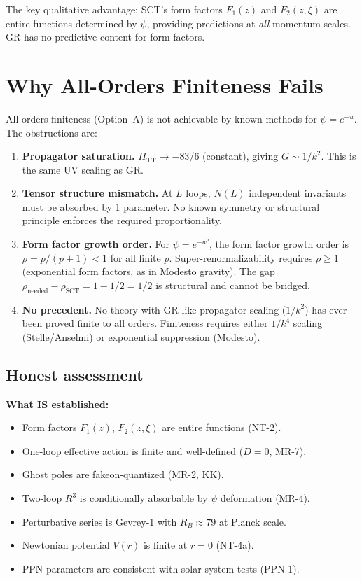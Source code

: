 \documentclass[12pt,a4paper]{article}
\begin{document}
The key qualitative advantage: SCT's form factors $F_1(z)$ and $F_2(z,\xi)$
are entire functions determined by $\psi$, providing predictions at
\emph{all} momentum scales. GR has no predictive content for form factors.

\section{Why All-Orders Finiteness Fails}
\label{sec:why-fails}

All-orders finiteness (Option~A) is not achievable by known methods for
$\psi = e^{-u}$. The obstructions are:

\begin{enumerate}
  \item \textbf{Propagator saturation.} $\Pi_{\mathrm{TT}} \to -83/6$ (constant),
    giving $G \sim 1/k^2$. This is the same UV scaling as GR.
  \item \textbf{Tensor structure mismatch.} At $L$ loops, $N(L)$ independent
    invariants must be absorbed by 1 parameter. No known symmetry or structural
    principle enforces the required proportionality.
  \item \textbf{Form factor growth order.} For $\psi = e^{-u^p}$, the form
    factor growth order is $\rho = p/(p+1) < 1$ for all finite $p$.
    Super-renormalizability requires $\rho \geq 1$ (exponential form factors,
    as in Modesto gravity). The gap $\rho_{\mathrm{needed}} - \rho_{\mathrm{SCT}}
    = 1 - 1/2 = 1/2$ is structural and cannot be bridged.
  \item \textbf{No precedent.} No theory with GR-like propagator scaling
    ($1/k^2$) has ever been proved finite to all orders. Finiteness requires
    either $1/k^4$ scaling (Stelle/Anselmi) or exponential suppression (Modesto).
\end{enumerate}

\subsection{Honest assessment}

\textbf{What IS established:}
\begin{itemize}
  \item Form factors $F_1(z)$, $F_2(z,\xi)$ are entire functions (NT-2).
  \item One-loop effective action is finite and well-defined ($D = 0$, MR-7).
  \item Ghost poles are fakeon-quantized (MR-2, KK).
  \item Two-loop $R^3$ is conditionally absorbable by $\psi$ deformation (MR-4).
  \item Perturbative series is Gevrey-1 with $R_B \approx 79$ at Planck scale.
  \item Newtonian potential $V(r)$ is finite at $r = 0$ (NT-4a).
  \item PPN parameters are consistent with solar system tests (PPN-1).
\end{itemize}
\end{document}
